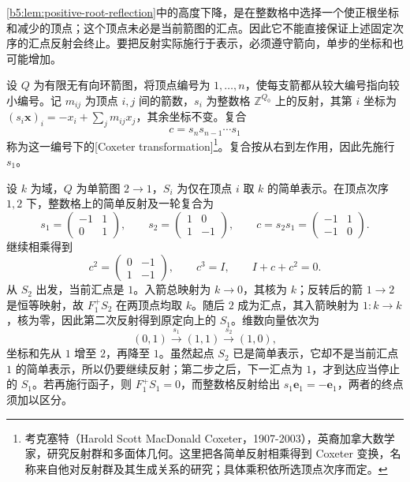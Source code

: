 \ProseParagraphBreak

\cref{b5:lem:positive-root-reflection}中的高度下降，是在整数格中选择一个使正根坐标和减少的顶点；这个顶点未必是当前箭图的汇点。因此它不能直接保证上述固定次序的汇点反射会终止。要把反射实际施行于表示，必须遵守箭向，单步的坐标和也可能增加。

\begin{definition}\label{b5:def:quiver-coxeter-transformation}
	设 \(Q\) 为有限无有向环箭图，将顶点编号为 \(1,\ldots,n\)，使每支箭都从较大编号指向较小编号。记 \(m_{ij}\) 为顶点 \(i,j\) 间的箭数，\(s_i\) 为整数格 \(\mathbb Z^{Q_0}\) 上的反射，其第 \(i\) 坐标为 \((s_i\mathbf x)_i=-x_i+\sum_jm_{ij}x_j\)，其余坐标不变。复合
	\[
		c=s_n s_{n-1}\cdots s_1
	\]
	称为这一编号下的[Coxeter transformation]\footnote{考克塞特（Harold Scott MacDonald Coxeter，1907-2003），英裔加拿大数学家，研究反射群和多面体几何。这里把各简单反射相乘得到 Coxeter 变换，名称来自他对反射群及其生成关系的研究；具体乘积依所选顶点次序而定。}。复合按从右到左作用，因此先施行 \(s_1\)。
\end{definition}

\begin{example}\label{b5:exm:a2-coxeter-sink-order}
	设 \(k\) 为域，\(Q\) 为单箭图 \(2\to1\)，\(S_i\) 为仅在顶点 \(i\) 取 \(k\) 的简单表示。在顶点次序 \(1,2\) 下，整数格上的简单反射及一轮复合为
	\[
		s_1=\begin{pmatrix}-1&1\\0&1\end{pmatrix},\qquad
		s_2=\begin{pmatrix}1&0\\1&-1\end{pmatrix},\qquad
		c=s_2s_1=\begin{pmatrix}-1&1\\-1&0\end{pmatrix}.
	\]
	继续相乘得到
	\[
		c^2=\begin{pmatrix}0&-1\\1&-1\end{pmatrix},\qquad
		c^3=I,\qquad I+c+c^2=0.
	\]
	从 \(S_2\) 出发，当前汇点是 \(1\)。入箭总映射为 \(k\to0\)，其核为 \(k\)；反转后的箭 \(1\to2\) 是恒等映射，故 \(F_1^+S_2\) 在两顶点均取 \(k\)。随后 \(2\) 成为汇点，其入箭映射为 \(1:k\to k\)，核为零，因此第二次反射得到原定向上的 \(S_1\)。维数向量依次为
	\[
		(0,1)\xrightarrow{s_1}(1,1)\xrightarrow{s_2}(1,0),
	\]
	坐标和先从 \(1\) 增至 \(2\)，再降至 \(1\)。虽然起点 \(S_2\) 已是简单表示，它却不是当前汇点 \(1\) 的简单表示，所以仍要继续反射；第二步之后，下一汇点为 \(1\)，才到达应当停止的 \(S_1\)。若再施行函子，则 \(F_1^+S_1=0\)，而整数格反射给出 \(s_1\mathbf e_1=-\mathbf e_1\)，两者的终点须加以区分。
\end{example}

